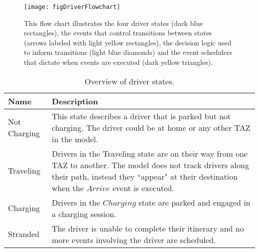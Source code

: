 \documentclass[journal]{IEEEtran}
\begin{document}
\begin{figure}[!h]
\centering
\texttt{[image: figDriverFlowchart]} 
\caption{This flow chart illustrates the four driver states (dark blue rectangles), the events that control transitions between states (arrows labeled with light yellow rectangles), the decision logic used to inform transitions (light blue diamonds) and the event schedulers that dictate when events are executed (dark yellow triangles).}
\label{fig:driver-flow}
\end{figure}


\begin{table}[!h]
\def\colmargin{6cm}
\renewcommand{\arraystretch}{1.3}
\caption{Overview of driver states.}
\label{tab:states}
\centering
\begin{tabular}{|ll|}
\hline
Name & Description \\
\hline
Not Charging  & \parbox[t]{\colmargin}{ \raggedright This state describes a driver that is parked but not charging.  The driver could be at home or any other TAZ in the model.} \\
Traveling &	\parbox[t]{\colmargin}{ \raggedright Drivers in the Traveling state are on their way from one TAZ to another.  The model does not track drivers along their path, instead they ``appear" at their destination when the $Arrive$ event is executed.} \\
Charging &	\parbox[t]{\colmargin}{ \raggedright Drivers in the $Charging$ state are parked and engaged in a charging session.} \\
Stranded &	\parbox[t]{\colmargin}{ \raggedright The driver is unable to complete their itinerary and no more events involving the driver are scheduled.} \\
\hline
\end{tabular}
\end{table}
\end{document}
